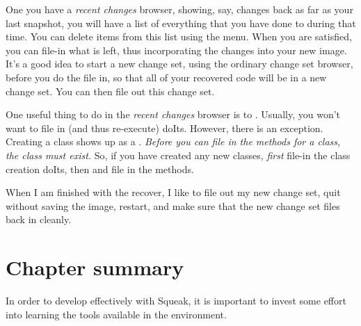 \documentclass[a4paper,10pt,twoside]{book}
\begin{document}
One you have a \emph{recent changes} browser, showing, say, changes back as far as your last snapshot, you will have a list of everything that you have done to \sq during that time. 
You can delete items from this list using the  menu.
When you are satisfied, you can file-in what is left, thus incorporating the changes into your new image.
It's a good idea to start a new change set, using the ordinary change set browser, before you do the file in, so that all of your recovered code will be in a new change set. 
You can then file out this change set.

One useful thing to do in the \emph{recent changes} browser is to . 
Usually, you won't want to file in (and thus re-execute) doIts. 
However, there is an exception. 
Creating a class shows up as a .
\emph{Before you can file in the methods for a class, the class must exist.}
So, if you have created any new classes, \emph{first} file-in the class creation doIts, then  and file in the methods.

When I am finished with the recover, I like to file out my new change set, quit \sq without saving the image, restart, and make sure that the new change set files back in cleanly.

\section{Chapter summary}

In order to develop effectively with Squeak, it is important to invest some effort into learning the tools available in the environment.
\end{document}
